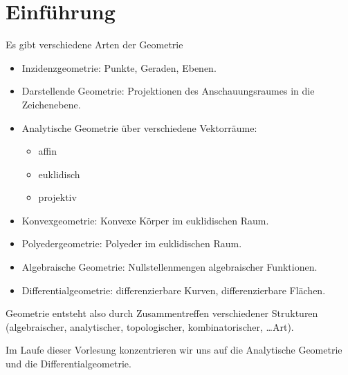 \chapter{Einführung}



Es gibt verschiedene Arten der Geometrie

\begin{itemize}
	\item
		Inzidenzgeometrie: Punkte, Geraden, Ebenen.
	\item
		Darstellende Geometrie: Projektionen des Anschauungsraumes in die Zeichenebene.
	\item
		Analytische Geometrie über verschiedene Vektorräume:
		\begin{itemize}
			\item
				affin
			\item
				euklidisch
			\item
				projektiv
		\end{itemize}
	\item
		Konvexgeometrie: Konvexe Körper im euklidischen Raum.
	\item
		Polyedergeometrie: Polyeder im euklidischen Raum.
	\item
		Algebraische Geometrie: Nullstellenmengen algebraischer Funktionen.
	\item
		Differentialgeometrie: differenzierbare Kurven, differenzierbare Flächen.
\end{itemize}
Geometrie entsteht also durch Zusammentreffen verschiedener Strukturen (algebraischer, analytischer, topologischer, kombinatorischer, \dots Art).

Im Laufe dieser Vorlesung konzentrieren wir uns auf die Analytische Geometrie und die Differentialgeometrie.


